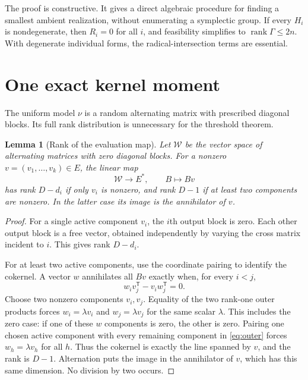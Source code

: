 \documentclass[11pt,letterpaper]{article}
\newtheorem{lemma}[theorem]{Lemma}
\theoremstyle{definition}
\theoremstyle{remark}
\newcommand{\rank}{\operatorname{rank}}
\begin{document}
The proof is constructive. It gives a direct algebraic procedure for finding a smallest ambient realization, without enumerating a symplectic group. If every $H_i$ is nondegenerate, then $R_i=0$ for all $i$, and feasibility simplifies to $\rank\Gamma\le2n$. With degenerate individual forms, the radical-intersection terms are essential.

\section{One exact kernel moment}

The uniform model $\nu$ is a random alternating matrix with prescribed diagonal blocks. Its full rank distribution is unnecessary for the threshold theorem.

\begin{lemma}[Rank of the evaluation map]\label{lem:eval}
Let $\mathcal W$ be the vector space of alternating matrices with zero diagonal blocks. For a nonzero $v=(v_1,\ldots,v_k)\in E$, the linear map
\[
 \mathcal W\longrightarrow E^*,\qquad B\longmapsto Bv
\]
has rank $D-d_i$ if only $v_i$ is nonzero, and rank $D-1$ if at least two components are nonzero. In the latter case its image is the annihilator of $v$.
\end{lemma}

\begin{proof}
For a single active component $v_i$, the $i$th output block is zero. Each other output block is a free vector, obtained independently by varying the cross matrix incident to $i$. This gives rank $D-d_i$.

For at least two active components, use the coordinate pairing to identify the cokernel. A vector $w$ annihilates all $Bv$ exactly when, for every $i<j$,
\begin{equation}\label{eq:outer}
 w_i v_j^{\mathsf T}-v_i w_j^{\mathsf T}=0.
\end{equation}
Choose two nonzero components $v_i,v_j$. Equality of the two rank-one outer products forces $w_i=\lambda v_i$ and $w_j=\lambda v_j$ for the same scalar $\lambda$. This includes the zero case: if one of these $w$ components is zero, the other is zero. Pairing one chosen active component with every remaining component in \eqref{eq:outer} forces $w_h=\lambda v_h$ for all $h$. Thus the cokernel is exactly the line spanned by $v$, and the rank is $D-1$. Alternation puts the image in the annihilator of $v$, which has this same dimension. No division by two occurs.
\end{proof}
\end{document}
